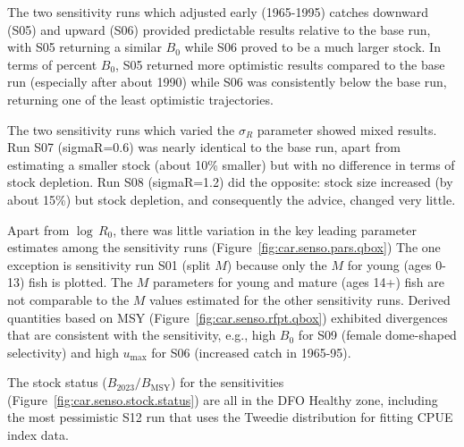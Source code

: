 \documentclass[11pt]{book}
\newcommand{\Bmsy}{B_\text{MSY}}
\newcommand{\pc}{\%}
\begin{document}
The two sensitivity runs which adjusted early (1965-1995) catches downward (S05) and upward (S06) provided predictable results relative to the base run, with S05 returning a similar $B_0$ while S06 proved to be a much larger stock.
In terms of percent $B_0$, S05 returned more optimistic results compared to the base run (especially after about 1990) while S06 was consistently below the base run, returning one of the least optimistic trajectories.

The two sensitivity runs which varied the $\sigma_R$ parameter showed mixed results.
Run S07 (sigmaR=0.6) was nearly identical to the base run, apart from estimating a smaller stock (about 10\pc{} smaller) but with no difference in terms of stock depletion.
Run S08 (sigmaR=1.2) did the opposite: stock size increased (by about 15\pc{}) but stock depletion, and consequently the advice, changed very little.

Apart from $\log\,R_0$, there was little variation in the key leading parameter estimates among the  sensitivity runs (Figure~\ref{fig:car.senso.pars.qbox})
The one exception is sensitivity run S01 (split $M$) because only the $M$ for young (ages 0-13) fish is plotted.
The $M$ parameters for young and mature (ages 14+) fish are not comparable to the $M$ values estimated for the other sensitivity runs.
Derived quantities based on MSY (Figure~\ref{fig:car.senso.rfpt.qbox}) exhibited divergences that are consistent with the sensitivity, e.g., high $B_0$ for S09 (female dome-shaped selectivity) and high $u_\text{max}$ for S06 (increased catch in 1965-95).

The stock status ($B_{2023}/\Bmsy$) for the sensitivities (Figure~\ref{fig:car.senso.stock.status}) are all in the DFO Healthy zone, including the most pessimistic S12 run that uses the Tweedie distribution for fitting CPUE index data.

\begin{landscapepage}{}{\LH}{\RH}{\LF}{\RF}
\end{landscapepage}

\begin{landscapepage}{}{\LH}{\RH}{\LF}{\RF}
\end{landscapepage}

\begin{landscapepage}{

}{\LH}{\RH}{\LF}{\RF} \end{landscapepage}

\begin{landscapepage}{
	
}{\LH}{\RH}{\LF}{\RF} \end{landscapepage}
\end{document}
